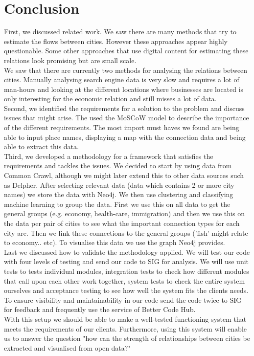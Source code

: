 \section{Conclusion}

First, we discussed related work. We saw there are many methods that try to estimate the flows between cities. However these approaches appear highly questionable. Some other approaches that use digital content for estimating these relations look promising but are small scale. 
\\

We saw that there are currently two methods for analysing the relations between cities. Manually analysing search engine data is very slow and requires a lot of man-hours and looking at the different locations where businesses are located is only interesting for the economic relation and still misses a lot of data.
\\

Second, we identified the requirements for a solution to the problem and discuss issues that might arise. The used the MoSCoW model to describe the importance of the different requirements. The most import must haves we found are being able to input place names, displaying a map with the connection data and being able to extract this data.
\\

Third, we developed a methodology for a framework that satisfies the requirements and tackles the issues. We decided to start by using data from Common Crawl, although we might later extend this to other data sources such as Delpher. After selecting relevant data (data which contains 2 or more city names) we store the data with Neo4j. We then use clustering and classifying machine learning to group the data. First we use this on all data to get the general groups (e.g. economy, health-care, immigration) and then we use this on the data per pair of cities to see what the important connection types for each city are. Then we link these connections to the general groups ('fish' might relate to economy.. etc). To visualise this data we use the graph Neo4j provides.
\\

Last we discussed how to validate the methodology applied. We will test our code with four levels of testing and send our code to SIG for analysis. We will use unit tests to tests individual modules, integration tests to check how different modules that call upon each other work together, system tests to check the entire system ourselves and acceptance testing to see how well the system fits the clients needs. To ensure visibility and maintainability in our code send the code twice to SIG for feedback and frequently use the service of Better Code Hub.
\\

With this setup we should be able to make a well-tested functioning system that meets the requirements of our clients. Furthermore, using this system will enable us to answer the question "how can the strength of relationships between cities be extracted and visualised from open data?" 